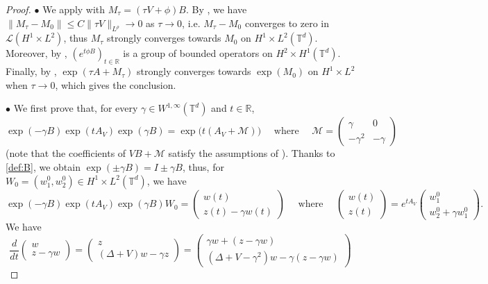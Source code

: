 \documentclass[a4paper]{article}
\theoremstyle{plain}
\newcommand{\T}{\mathbb{T}}
\newcommand{\R}{\mathbb{R}}
\begin{document}
\begin{proof}
\noindent $\bullet$ We apply  with $M_{\tau}=(\tau V+\phi) B$. By , we have $\| M_{\tau}-M_0\| \leq C \|\tau V \|_{L^{\rho}} \to 0$ as $\tau \to 0$, i.e. $M_{\tau}-M_0$ converges to zero in $\mathcal{L}(H^1 \times L^2)$, thus $M_{\tau}$ strongly converges towards $M_0$ on $H^1 \times L^2(\T^d)$.
Moreover, by , $(e^{t\phi B})_{t\in\mathbb{R}}$ is a group of bounded operators on $H^2 \times H^1(\T^d)$. Finally, by , $\exp(\tau A+M_{\tau})$ strongly converges towards $\exp(M_0)$ on $H^1 \times L^2$ when $\tau \to 0$, which gives the conclusion.   

\medskip

\noindent $\bullet$ We first prove that, for every $\gamma \in W^{1,\infty}(\T^d)$ and $t\in\R$,
\begin{equation} \label{formule1}
\exp(-\gamma B) \exp(t A_V) \exp( \gamma B) = \exp\big(t(A_V+\mathcal{M})\big) 
\quad \text{ where } \quad \mathcal{M}=\begin{pmatrix}
\gamma & 0 \\ -\gamma^2 & -\gamma
\end{pmatrix}
\end{equation}
(note that the coefficients of $VB+\mathcal{M}$ satisfy the assumptions of ).
Thanks to \eqref{def:B}, we obtain $\exp(\pm \gamma B)=I\pm\gamma B$, thus,
for $W_0=(w_1^0,w_2^0) \in H^1 \times L^2(\T^d)$, we have
$$\exp(-\gamma B) \exp(t A_V) \exp( \gamma B) W_0 =
\begin{pmatrix}
    w(t) \\ z(t)-\gamma w(t)
\end{pmatrix}
\quad \text{ where } \quad
\begin{pmatrix}
    w(t) \\ z(t)
\end{pmatrix}
= e^{t A_V} \begin{pmatrix}
    w_1^0 \\ w_2^0+\gamma w_1^0
\end{pmatrix}.$$
We have 
$$\frac{d}{dt} 
\begin{pmatrix}
    w \\ z-\gamma w
\end{pmatrix}
=
\begin{pmatrix}
    z \\ (\Delta+V)w-\gamma z
\end{pmatrix}
=\begin{pmatrix}
   \gamma w + (z-\gamma w) \\ (\Delta+V-\gamma^2)w-\gamma (z-\gamma w)

\end{pmatrix}$$
\end{proof}
\end{document}
